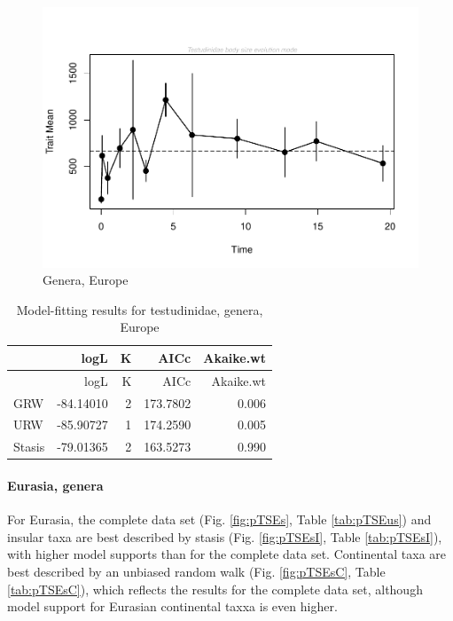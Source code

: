 \begin{figure}[H]
	\centering
	\includegraphics{MA_JJ_files/figure-latex/paleoTSEurope-1.pdf}
	\caption{Genera, Europe}
	\label{fig:pTSEu}
\end{figure}

\begin{longtable}[]{@{}lrrrr@{}}
	\caption{Model-fitting results for testudinidae, genera,
		Europe}
	\label{tab:pTSEuEM}\tabularnewline
	\toprule
	& logL & K & AICc & Akaike.wt\tabularnewline
	\midrule
	\endfirsthead
	\toprule
	& logL & K & AICc & Akaike.wt\tabularnewline
	\midrule
	\endhead
	GRW & -84.14010 & 2 & 173.7802 & 0.006\tabularnewline
	URW & -85.90727 & 1 & 174.2590 & 0.005\tabularnewline
	Stasis & -79.01365 & 2 & 163.5273 & 0.990\tabularnewline
	\bottomrule
\end{longtable}

\FloatBarrier



\paragraph{Eurasia,	genera}\label{eurasia-genera}


For Eurasia, the complete data set (Fig. \ref{fig:pTSEs}, Table \ref{tab:pTSEus}) and insular taxa are best described by stasis (Fig. \ref{fig:pTSEsI}, Table \ref{tab:pTSEsI}), with higher model supports than for the complete data set. Continental taxa are best described by an unbiased random walk (Fig. \ref{fig:pTSEsC}, Table \ref{tab:pTSEsC}), which reflects the results for the complete data set, although model support for Eurasian continental taxxa is even higher.




